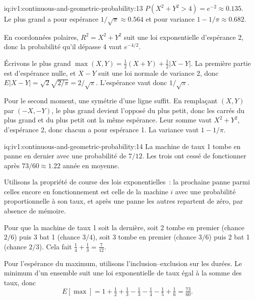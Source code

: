 \begin{solution}{iq:iv1:continuous-and-geometric-probability:13}
$P(X^2 + Y^2 > 4) = e^{-2} \approx 0.135$. Le plus grand a pour espérance $1/\sqrt{\pi} \approx 0.564$ et pour variance $1 - 1/\pi \approx 0.682$.

En coordonnées polaires, $R^2 = X^2 + Y^2$ suit une loi exponentielle d'espérance 2, donc la probabilité qu'il dépasse 4 vaut $e^{-4/2}$.

Écrivons le plus grand $\max(X, Y) = \tfrac12(X + Y) + \tfrac12|X - Y|$. La première partie est d'espérance nulle, et $X - Y$ suit une loi normale de variance 2, donc $E|X - Y| = \sqrt{2}\sqrt{2/\pi} = 2/\sqrt{\pi}$. L'espérance vaut donc $1/\sqrt{\pi}$.

Pour le second moment, une symétrie d'une ligne suffit. En remplaçant $(X, Y)$ par $(-X, -Y)$, le plus grand devient l'opposé du plus petit, donc les carrés du plus grand et du plus petit ont la même espérance. Leur somme vaut $X^2 + Y^2$, d'espérance 2, donc chacun a pour espérance 1. La variance vaut $1 - 1/\pi$.

\end{solution}

\begin{solution}{iq:iv1:continuous-and-geometric-probability:14}
La machine de taux 1 tombe en panne en dernier avec une probabilité de $7/12$. Les trois ont cessé de fonctionner après $73/60 \approx 1.22$ année en moyenne.

Utilisons la propriété de course des lois exponentielles~: la prochaine panne parmi celles encore en fonctionnement est celle de la machine $i$ avec une probabilité proportionnelle à son taux, et après une panne les autres repartent de zéro, par absence de mémoire.

Pour que la machine de taux 1 soit la dernière, soit 2 tombe en premier (chance $2/6$) puis 3 bat 1 (chance $3/4$), soit 3 tombe en premier (chance $3/6$) puis 2 bat 1 (chance $2/3$). Cela fait $\tfrac14 + \tfrac13 = \tfrac{7}{12}$.

Pour l'espérance du maximum, utilisons l'inclusion--exclusion sur les durées. Le minimum d'un ensemble suit une loi exponentielle de taux égal à la somme des taux, donc
\[
E[\max] = 1 + \tfrac12 + \tfrac13 - \tfrac13 - \tfrac14 - \tfrac15 + \tfrac16 = \tfrac{73}{60}.
\]
\end{solution}

